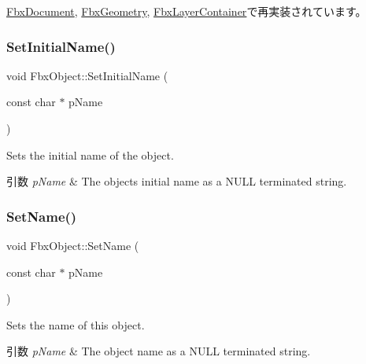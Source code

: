 \hyperlink{class_fbx_document_a063190c324b6fb999b4ac2a1169c2aab}{Fbx\+Document}, \hyperlink{class_fbx_geometry_a4e28b47a5f6dba7d53e692486d69c126}{Fbx\+Geometry}, \hyperlink{class_fbx_layer_container_a1743b1727b9f522d69bbf0d65c2a5073}{Fbx\+Layer\+Container}で再実装されています。

\mbox{\label{class_fbx_object_a97b6469f5877e37d352b6f6224791fb2}} 
\subsubsection{\texorpdfstring{Set\+Initial\+Name()}{SetInitialName()}}
{\footnotesize\ttfamily void Fbx\+Object\+::\+Set\+Initial\+Name (\begin{DoxyParamCaption}\item[{const char $\ast$}]{p\+Name }\end{DoxyParamCaption})}

Sets the initial name of the object. 
\begin{DoxyParams}{引数}
{\em p\+Name} & The object\textquotesingle{}s initial name as a {\ttfamily N\+U\+LL} terminated string. \\
\hline
\end{DoxyParams}
\mbox{\label{class_fbx_object_aceea1c2fdb26784d668d05dd52df0d68}} 
\subsubsection{\texorpdfstring{Set\+Name()}{SetName()}}
{\footnotesize\ttfamily void Fbx\+Object\+::\+Set\+Name (\begin{DoxyParamCaption}\item[{const char $\ast$}]{p\+Name }\end{DoxyParamCaption})}

Sets the name of this object. 
\begin{DoxyParams}{引数}
{\em p\+Name} & The object name as a {\ttfamily N\+U\+LL} terminated string. \\
\hline
\end{DoxyParams}
\mbox{\label{class_fbx_object_a0546604cdd763f630c9ffdf9cfcf8bdc}} 
